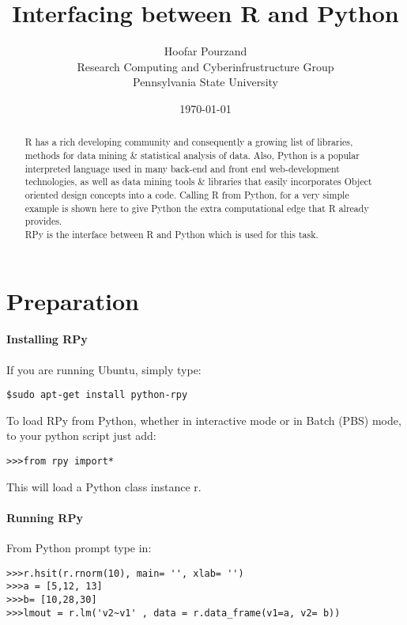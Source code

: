 \documentclass[12pt]{article}
\begin{document}
\title{Interfacing between R and Python}
\author{
        Hoofar Pourzand \\
        Research Computing and Cyberinfrustructure Group\\
        Pennsylvania State University\\        
            \and
        }
\date{\today}
\maketitle

\begin{abstract}
R has a rich developing community and consequently a growing list of libraries, methods for data mining \& statistical analysis of data. Also, Python is a popular interpreted language used in many back-end and front end web-development technologies, as well as data mining tools \& libraries that easily incorporates Object oriented design concepts into a code. Calling R from Python, for a very simple example is shown here to give Python the extra computational edge that R already provides.\\
RPy is the interface between R and Python which is used for this task. 
\end{abstract}

\section{Preparation}

\paragraph{Installing RPy}
If you are running Ubuntu, simply type: \\
\begin{lstlisting}[label=Adding RPy ,caption= Installing RPy]
$sudo apt-get install python-rpy
\end{lstlisting}

To load RPy from Python, whether in interactive mode or in Batch (PBS) mode, to your python script just add:
\begin{lstlisting}[label=Loading RPy ,caption= Loading PPy]
>>>from rpy import*
\end{lstlisting}
This will load a Python class instance r.

\paragraph{Running RPy}
From Python prompt type in:
\begin{lstlisting}[label=Adding RPy ,caption= Running RPy]
>>>r.hsit(r.rnorm(10), main= '', xlab= '')
>>>a = [5,12, 13]
>>>b= [10,28,30]
>>>lmout = r.lm('v2~v1' , data = r.data_frame(v1=a, v2= b))

\end{lstlisting}
\end{document}
